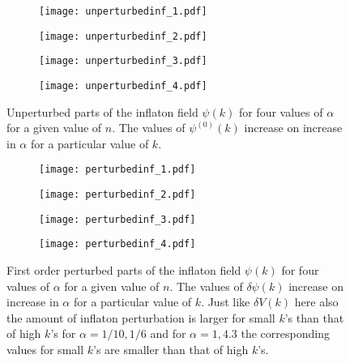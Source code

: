 \documentclass[a4paper,11pt]{article}
\begin{document}
 \begin{figure}[H]
\begin{subfigure}{0.52\linewidth}
  \centering
   \texttt{[image: unperturbedinf\_1.pdf]} 
   \subcaption{}
   \label{fig:unperturbedINF_1}
\end{subfigure}%
\begin{subfigure}{0.52\linewidth}
  \centering
   \texttt{[image: unperturbedinf\_2.pdf]}
   \subcaption{}
   \label{fig:unperturbedINF_2}
\end{subfigure}%
\vspace{0.1\linewidth}
\begin{subfigure}{0.52\linewidth}
  \centering
   \texttt{[image: unperturbedinf\_3.pdf]}
   \subcaption{}
    \label{fig:unperturbedINF_3}
\end{subfigure}%
\begin{subfigure}{0.52\linewidth}
  \centering
   \texttt{[image: unperturbedinf\_4.pdf]}
   \subcaption{}
    \label{fig:unperturbedINF_4}
\end{subfigure}
\caption{Unperturbed parts of the inflaton field $\psi(k)$ for four values of $\alpha$ for a given value of $n$. The values of $\psi^{(0)}(k)$ increase on increase in $\alpha$ for a particular value of $k$.}
\label{fig:unperturbedINF}
\end{figure}
 \begin{figure}[H]
\begin{subfigure}{0.52\linewidth}
  \centering
   \texttt{[image: perturbedinf\_1.pdf]} 
   \subcaption{}
   \label{fig:perturbedINF_1}
\end{subfigure}%
\begin{subfigure}{0.52\linewidth}
  \centering
   \texttt{[image: perturbedinf\_2.pdf]}
   \subcaption{}
   \label{fig:perturbedINF_2}
\end{subfigure}%
\vspace{0.1\linewidth}
\begin{subfigure}{0.52\linewidth}
  \centering
   \texttt{[image: perturbedinf\_3.pdf]}
   \subcaption{}
    \label{fig:perturbedINF_3}
\end{subfigure}%
\begin{subfigure}{0.52\linewidth}
  \centering
   \texttt{[image: perturbedinf\_4.pdf]}
   \subcaption{}
    \label{fig:perturbedINF_4}
\end{subfigure}
\caption{First order perturbed parts of the inflaton field $\psi(k)$ for four values of $\alpha$ for a given value of $n$. The values of $\delta \psi(k)$ increase on increase in $\alpha$ for a particular value of $k$. Just like $\delta V(k)$ here also the amount of inflaton perturbation is larger for small $k$'s than that of high $k$'s for $\alpha=1/10,1/6$ and for $\alpha=1,4.3$ the corresponding values for small $k$'s are smaller than that of high $k$'s.}
\label{fig:perturbedINF}
\end{figure}
\end{document}
